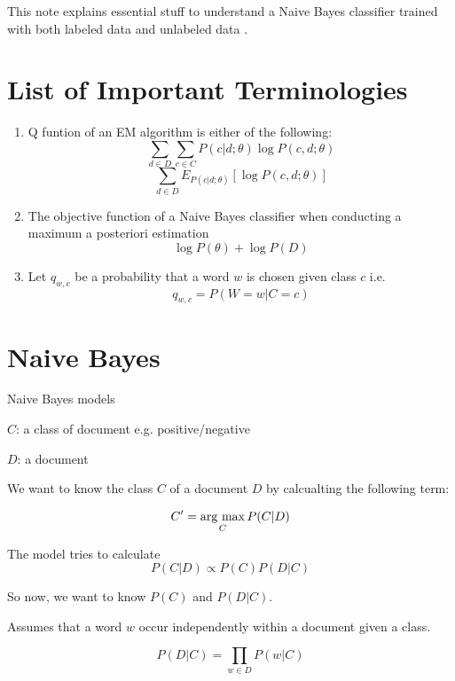 \documentclass[11pt]{article}
\newcommand{\argmax}{\mathop{\rm arg~max}\limits}
\begin{document}
This note explains essential stuff to understand a Naive Bayes classifier trained with both labeled data and unlabeled data \cite{nigam2000text,Takamura2010}.


\section{List of Important Terminologies}
\begin{enumerate}
 \item Q funtion of an EM algorithm is either of the following:
$$\sum_{d \in D} \sum_{c \in C} P(c|d; \theta) \log P(c, d; \theta)$$
$$\sum_{d \in D} E_{P(c|d; \theta)}[ \log P(c, d; \theta)]$$
 \item The objective function of a Naive Bayes classifier when conducting a maximum a posteriori estimation 
$$\log P(\theta) + \log P(D)$$
\item Let $q_{w,c}$ be a probability that a word $w$ is chosen given class $c$ i.e.
$$q_{w,c} = P(W = w | C = c)$$
\end{enumerate}


\section{Naive Bayes}
Naive Bayes models 

$C$: a class of document e.g. positive/negative

$D$: a document

We want to know the class $C$ of a document $D$ by calcualting the following term:

$$C' = \argmax_{C} P(C|D)$$

The model tries to calculate
$$P(C|D) \propto P(C) P(D|C)$$

So now, we want to know $P(C)$ and $P(D|C)$.

Assumes that a word $w$ occur independently within a document given a class.

$$P(D|C) = \prod_{w \in D} P(w|C)$$
\end{document}
